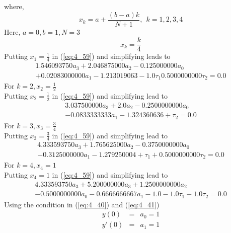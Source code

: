 \documentclass[12pt]{report}
\newcommand{\sps}{\\[0.2cm]}
\newcommand{\refn}[1]{(\ref{#1})}
\newcommand{\refx}[1]{\refn{eq:#1}}
\newcommand{\sprime}{'}
\begin{document}
	where,
	\begin{equation}
		x_k = a + \frac{(b-a)k}{N+1}, ~~ k=1,2,3,4 \label{eq:4_61}
	\end{equation}
	Here, $a=0, b=1, N=3$
	\begin{equation*}
		x_k = \frac{k}{4}
	\end{equation*}
	Putting $x_1 = \frac{1}{4}$ in \refx{4_59} and simplifying leads to 
	\begin{equation}
		\begin{array}{c}
			1.546093750a_3 + 2.046875000a_2 - 0.125000000a_0\\
			+ 0.02083000000a_1 - 1.213019063-1.0\tau_1 0.5000000000\tau_2 = 0.0
		\end{array}
		\label{eq:4_62}
	\end{equation}
	For $k=2, x_2 = \frac{1}{2}$\sps
	Putting $x_2 = \frac{1}{2}$ in \refx{4_59} and simplifying lead to
	\begin{equation}
		\begin{array}{c}
			3.037500000a_3 + 2.0a_2 - 0.2500000000a_0\\
			-0.0833333333a_1 - 1.324360636 + \tau_2 = 0.0
		\end{array}
		\label{eq:4_63}
	\end{equation}
	For $k=3, x_3 = \frac{3}{4}$\sps
	Putting $x_3 = \frac{3}{4}$ in \refx{4_59} and simplifying lead to
	\begin{equation}
		\begin{array}{c}
			4.333593750a_3 + 1.765625000a_2 - 0.3750000000a_0~~~~~~~~~~~~~~~~~~~~\\
			-0.3125000000a_1 - 1.279250004 + \tau_1 + 0.5000000000\tau_2 = 0.0
		\end{array}
		\label{eq:4_64}
	\end{equation}
	For $k=4, x_4 = 1$\sps
	Putting $x_4 = 1$ in \refx{4_59} and simplifying lead to
	\begin{equation}
		\begin{array}{c}
			4.333593750a_3 + 5.200000000a_3 + 1.2500000000a_2~~~~~~~~~~~~~~~~~~~~\\
			 - 0.5000000000a_0
			-0.6666666667a_1 - 1.0-1.0\tau_1 - 1.0\tau_2 = 0.0
		\end{array}
		\label{eq:4_65}
	\end{equation}
	Using the condition in \refx{4_40} and \refx{4_41}
	\begin{eqnarray}
		y(0) &=& a_0 =  1 \label{eq:4_66}\\
		y\sprime(0) &=& a_1 =  1 \label{eq:4_67}
	\end{eqnarray}
\end{document}
